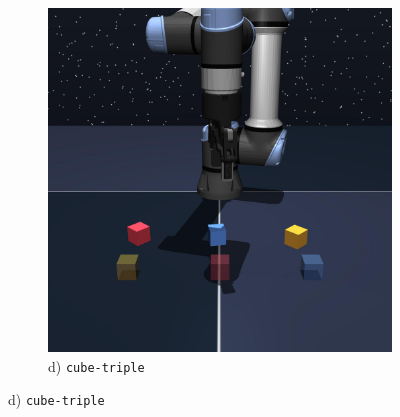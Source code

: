 \begin{figure}[t]
\begin{minipage}{0.24\textwidth}
\begin{subfigure}{\textwidth}
            \includegraphics[width=0.98\linewidth]{figures/renders/cube-triple-play-singletask-task2-v0.jpeg}
            \caption{\footnotesize d) \texttt{cube-triple}}
            \label{fig:cube-triple-viz}
        \end{subfigure}
    \end{minipage}


\end{figure}

